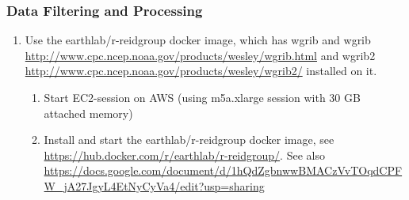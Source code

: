 \subsubsection*{Data Filtering and Processing}

\begin{enumerate}

\item Use the earthlab/r-reidgroup docker image, which has wgrib and wgrib \url{http://www.cpc.ncep.noaa.gov/products/wesley/wgrib.html} and wgrib2 \url{http://www.cpc.ncep.noaa.gov/products/wesley/wgrib2/} installed on it.
	\begin{enumerate}
		\item Start EC2-session on AWS (using m5a.xlarge session with 30 GB attached memory)
		\item Install and start the earthlab/r-reidgroup docker image, see \url{https://hub.docker.com/r/earthlab/r-reidgroup/}. See also \url{https://docs.google.com/document/d/1hQdZgbnwwBMACzVvTOqdCPFW_jA27JgyL4EtNyCyVa4/edit?usp=sharing}
	\end{enumerate}



\end{enumerate}
